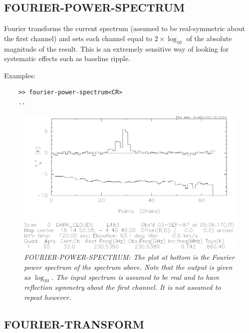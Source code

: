 \documentclass[11pt,twoside]{report}
\begin{document}
\subsection{FOURIER-POWER-SPECTRUM} 

Fourier transforms the current spectrum (assumed to be real-symmetric about
the first channel) and sets each channel equal to $2\times\log_{10}$ of the
absolute magnitude of the result. This is an extremely sensitive
way of looking for systematic effects such as baseline ripple.

Examples:
\begin{verbatim}
    >> fourier-power-spectrum<CR>
    ..
\end{verbatim}

\begin{figure}[htbp]
\begin{center}
\includegraphics[scale=0.65]{f-p-s}
\protect\parbox{5.5in}
{\caption[FPS]
{\sl
FOURIER-POWER-SPECTRUM: The plot at bottom is the Fourier power spectrum of the
spectrum above. Note that the output is given as $\log_{10}$. The input
spectrum is assumed to be real and to have reflection symmetry about the first
channel. It is not assumed to repeat however.
\label{FPS}
}
}
\end{center}
\end{figure}

\subsection{FOURIER-TRANSFORM} 
\end{document}
